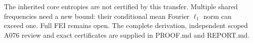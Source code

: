 \documentclass{article}
\begin{document}
The inherited core entropies are not certified by this transfer. Multiple shared frequencies need a new bound: their conditional mean Fourier $\ell_1$ norm can exceed one. Full FEI remains open. The complete derivation, independent scoped A076 review and exact certificates are supplied in PROOF.md and REPORT.md.
\end{document}
